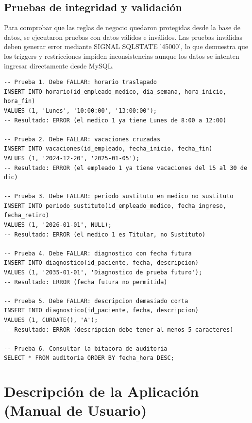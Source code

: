 \documentclass[12pt,a4paper]{article}
\begin{document}
\newpage
\subsection{Pruebas de integridad y validaci\'on}

Para comprobar que las reglas de negocio quedaron protegidas desde la base de datos, se ejecutaron pruebas con datos v\'alidos e inv\'alidos. Las pruebas inv\'alidas deben generar error mediante SIGNAL SQLSTATE '45000', lo que demuestra que los triggers y restricciones impiden inconsistencias aunque los datos se intenten ingresar directamente desde MySQL.

{\small\begin{verbatim}
-- Prueba 1. Debe FALLAR: horario traslapado
INSERT INTO horario(id_empleado_medico, dia_semana, hora_inicio, hora_fin)
VALUES (1, 'Lunes', '10:00:00', '13:00:00');
-- Resultado: ERROR (el medico 1 ya tiene Lunes de 8:00 a 12:00)

-- Prueba 2. Debe FALLAR: vacaciones cruzadas
INSERT INTO vacaciones(id_empleado, fecha_inicio, fecha_fin)
VALUES (1, '2024-12-20', '2025-01-05');
-- Resultado: ERROR (el empleado 1 ya tiene vacaciones del 15 al 30 de dic)

-- Prueba 3. Debe FALLAR: periodo sustituto en medico no sustituto
INSERT INTO periodo_sustituto(id_empleado_medico, fecha_ingreso, fecha_retiro)
VALUES (1, '2026-01-01', NULL);
-- Resultado: ERROR (el medico 1 es Titular, no Sustituto)

-- Prueba 4. Debe FALLAR: diagnostico con fecha futura
INSERT INTO diagnostico(id_paciente, fecha, descripcion)
VALUES (1, '2035-01-01', 'Diagnostico de prueba futuro');
-- Resultado: ERROR (fecha futura no permitida)

-- Prueba 5. Debe FALLAR: descripcion demasiado corta
INSERT INTO diagnostico(id_paciente, fecha, descripcion)
VALUES (1, CURDATE(), 'A');
-- Resultado: ERROR (descripcion debe tener al menos 5 caracteres)

-- Prueba 6. Consultar la bitacora de auditoria
SELECT * FROM auditoria ORDER BY fecha_hora DESC;
\end{verbatim}}

\newpage
\section{Descripci\'on de la Aplicaci\'on (Manual de Usuario)}
\end{document}
